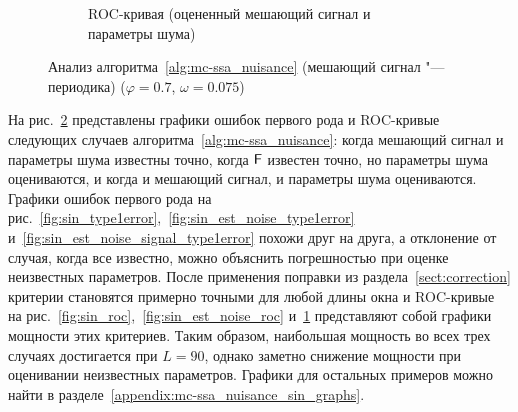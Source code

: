\documentclass[specialist,
substylefile = spbu_report.rtx,
subf,href,colorlinks=true, 12pt]{disser}
\theoremstyle{definition}
\begin{document}
\begin{figure}[h!]
\begin{subfigure}[t]{0.5\textwidth}
		\caption{ROC-кривая (оцененный мешающий сигнал и параметры шума)}
		\label{fig:sin_est_noise_signal_roc}
	\end{subfigure}
	
	
	\caption{Анализ алгоритма~\ref{alg:mc-ssa_nuisance} (мешающий сигнал "--- периодика) ($\varphi=0.7$, $\omega=0.075$)}
	\label{fig:sin}
\end{figure}

На рис.~\ref{fig:sin} представлены графики ошибок первого рода и ROC-кривые следующих случаев алгоритма~\ref{alg:mc-ssa_nuisance}: когда мешающий сигнал и параметры шума известны точно, когда $\mathsf{F}$ известен точно, но параметры шума оцениваются, и когда и мешающий сигнал, и параметры шума оцениваются. Графики ошибок первого рода на рис.~\ref{fig:sin_type1error},~\ref{fig:sin_est_noise_type1error} и~\ref{fig:sin_est_noise_signal_type1error} похожи друг на друга, а отклонение от случая, когда все известно, можно объяснить погрешностью при оценке неизвестных параметров. После применения поправки из раздела~\ref{sect:correction} критерии становятся примерно точными для любой длины окна и ROC-кривые на рис.~\ref{fig:sin_roc},~\ref{fig:sin_est_noise_roc} и~\ref{fig:sin_est_noise_signal_roc} представляют собой графики мощности этих критериев. Таким образом, наибольшая мощность во всех трех случаях достигается при $L=90$, однако заметно снижение мощности при оценивании неизвестных параметров. Графики для остальных примеров можно найти в разделе~\ref{appendix:mc-ssa_nuisance_sin_graphs}.

\end{document}
